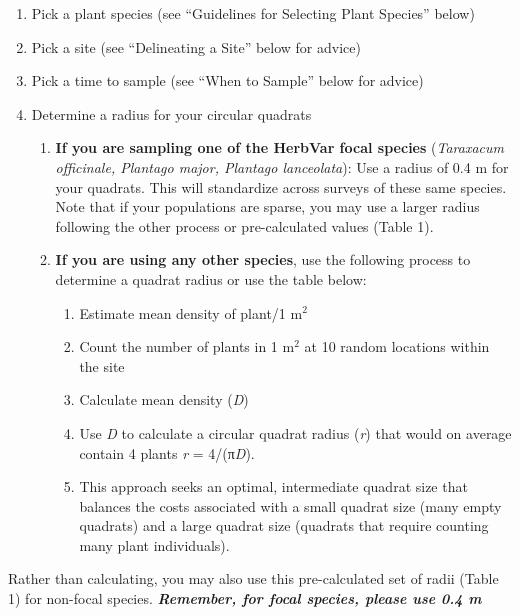 \documentclass[
  letterpaper,
  DIV=11,
  numbers=noendperiod]{scrreprt}
\providecommand{\tightlist}{%
  \setlength{\itemsep}{0pt}\setlength{\parskip}{0pt}}\usepackage{longtable,booktabs,array}
\begin{document}
\begin{enumerate}
\def\labelenumi{\arabic{enumi}.}
\item
  Pick a plant species (see ``Guidelines for Selecting Plant Species''
  below)
\item
  Pick a site (see ``Delineating a Site'' below for advice)
\item
  Pick a time to sample (see ``When to Sample'' below for advice)
\item
  Determine a radius for your circular quadrats

  \begin{enumerate}
  \def\labelenumii{\alph{enumii}.}
  \item
    \textbf{If you are sampling one of the HerbVar focal species}
    (\emph{Taraxacum officinale, Plantago major, Plantago lanceolata}):
    Use a radius of 0.4 m for your quadrats. This will standardize
    across surveys of these same species. Note that if your populations
    are sparse, you may use a larger radius following the other process
    or pre-calculated values (Table 1).
  \item
    \textbf{If you are using any other species}, use the following
    process to determine a quadrat radius or use the table below:

    \begin{enumerate}
    \def\labelenumiii{\arabic{enumiii}.}
    \tightlist
    \item
      Estimate mean density of plant/1 m\(^2\)
    \item
      Count the number of plants in 1 m\(^2\) at 10 random locations
      within the site
    \item
      Calculate mean density (\emph{D})
    \item
      Use \emph{D} to calculate a circular quadrat radius (\emph{r})
      that would on average contain 4 plants \emph{r} = 4/(π\emph{D}).
    \item
      This approach seeks an optimal, intermediate quadrat size that
      balances the costs associated with a small quadrat size (many
      empty quadrats) and a large quadrat size (quadrats that require
      counting many plant individuals).
    \end{enumerate}
  \end{enumerate}
\end{enumerate}

Rather than calculating, you may also use this pre-calculated set of
radii (Table 1) for non-focal species. \textbf{\emph{Remember, for focal
species, please use 0.4 m}}
\end{document}
